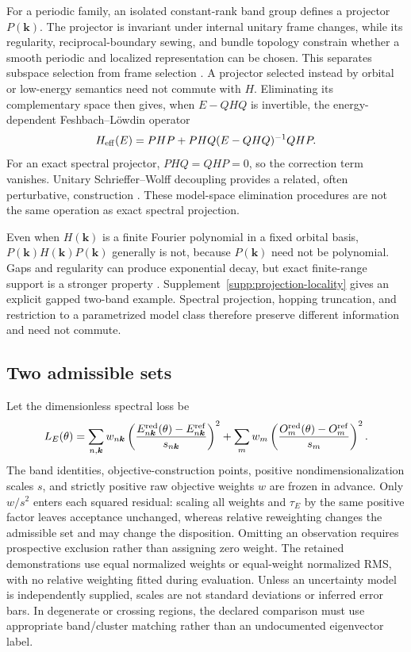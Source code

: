 \documentclass[11pt]{article}
\begin{document}
For a periodic family, an isolated constant-rank band group defines a projector $P(\bm k)$. The projector is invariant under internal unitary frame changes, while its regularity, reciprocal-boundary sewing, and bundle topology constrain whether a smooth periodic and localized representation can be chosen. This separates subspace selection from frame selection \cite{kohn1959,descloizeaux1964,brouder2007,marzari1997}. A projector selected instead by orbital or low-energy semantics need not commute with $H$. Eliminating its complementary space then gives, when $E-QHQ$ is invertible, the energy-dependent Feshbach--L\"owdin operator
\begin{equation}\label{eq:downfold}
H_{\rm eff}(E)=PHP+PHQ(E-QHQ)^{-1}QHP.
\end{equation}
For an exact spectral projector, $PHQ=QHP=0$, so the correction term vanishes. Unitary Schrieffer--Wolff decoupling provides a related, often perturbative, construction \cite{lowdin1962,bravyi2011}. These model-space elimination procedures are not the same operation as exact spectral projection.

Even when $H(\bm k)$ is a finite Fourier polynomial in a fixed orbital basis, $P(\bm k)H(\bm k)P(\bm k)$ generally is not, because $P(\bm k)$ need not be polynomial. Gaps and regularity can produce exponential decay, but exact finite-range support is a stronger property \cite{benzi2013}. Supplement~\ref{supp:projection-locality} gives an explicit gapped two-band example. Spectral projection, hopping truncation, and restriction to a parametrized model class therefore preserve different information and need not commute.

\subsection{Two admissible sets}
Let the dimensionless spectral loss be
\begin{equation}\label{eq:LE}
 L_E(\theta)=\sum_{n,\bm k}w_{n\bm k}\left(\frac{E^{\rm red}_{n\bm k}(\theta)-E^{\rm ref}_{n\bm k}}{s_{n\bm k}}\right)^2
 +\sum_m w_m\left(\frac{O_m^{\rm red}(\theta)-O_m^{\rm ref}}{s_m}\right)^2.
\end{equation}
The band identities, objective-construction points, positive nondimensionalization scales $s$, and strictly positive raw objective weights $w$ are frozen in advance. Only $w/s^2$ enters each squared residual: scaling all weights and $\tau_E$ by the same positive factor leaves acceptance unchanged, whereas relative reweighting changes the admissible set and may change the disposition. Omitting an observation requires prospective exclusion rather than assigning zero weight. The retained demonstrations use equal normalized weights or equal-weight normalized RMS, with no relative weighting fitted during evaluation. Unless an uncertainty model is independently supplied, scales are not standard deviations or inferred error bars. In degenerate or crossing regions, the declared comparison must use appropriate band/cluster matching rather than an undocumented eigenvector label.
\end{document}
